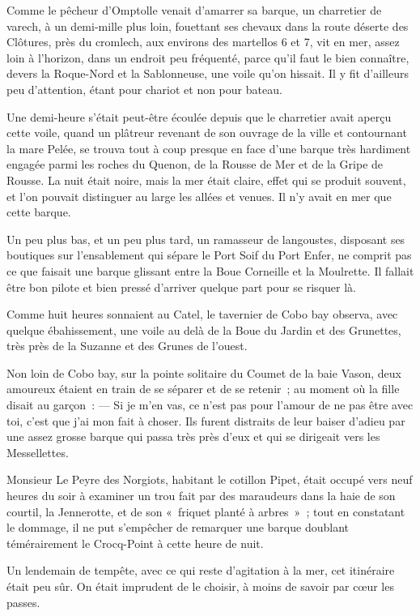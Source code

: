 \documentclass[french,twoside]{book} %
\begin{document}
Comme le pêcheur d’Omptolle venait d’amarrer sa barque, un charretier de varech, à un demi-mille plus loin, fouettant ses chevaux dans la route déserte des Clôtures, près du cromlech, aux environs des martellos 6 et 7, vit en mer, assez loin à l’horizon, dans un endroit peu fréquenté, parce qu’il faut le bien  connaître, devers la Roque-Nord et la Sablonneuse, une voile qu’on hissait. Il y fit d’ailleurs peu d’attention, étant pour chariot et non pour bateau.\par
Une demi-heure s’était peut-être écoulée depuis que le charretier avait aperçu cette voile, quand un plâtreur revenant de son ouvrage de la ville et contournant la mare Pelée, se trouva tout à coup presque en face d’une barque très hardiment engagée parmi les roches du Quenon, de la Rousse de Mer et de la Gripe de Rousse. La nuit était noire, mais la mer était claire, effet qui se produit souvent, et l’on pouvait distinguer au large les allées et venues. Il n’y avait en mer que cette barque.\par
Un peu plus bas, et un peu plus tard, un ramasseur de langoustes, disposant ses boutiques sur l’ensablement qui sépare le Port Soif du Port Enfer, ne comprit pas ce que faisait une barque glissant entre la Boue Corneille et la Moulrette. Il fallait être bon pilote et bien pressé d’arriver quelque part pour se risquer là.\par
Comme huit heures sonnaient au Catel, le tavernier de Cobo bay observa, avec quelque ébahissement, une voile au delà de la Boue du Jardin et des Grunettes, très près de la Suzanne et des Grunes de l’ouest.\par
Non loin de Cobo bay, sur la pointe solitaire du Coumet de la baie Vason, deux amoureux étaient en train de se séparer et de se retenir ; au moment où la fille disait au garçon : — Si je m’en vas, ce n’est pas pour l’amour de ne pas être avec toi, c’est que j’ai  mon fait à choser. Ils furent distraits de leur baiser d’adieu par une assez grosse barque qui passa très près d’eux et qui se dirigeait vers les Messellettes.\par
Monsieur Le Peyre des Norgiots, habitant le cotillon Pipet, était occupé vers neuf heures du soir à examiner un trou fait par des maraudeurs dans la haie de son courtil, la Jennerotte, et de son « friquet planté à arbres » ; tout en constatant le dommage, il ne put s’empêcher de remarquer une barque doublant témérairement le Crocq-Point à cette heure de nuit.\par
Un lendemain de tempête, avec ce qui reste d’agitation à la mer, cet itinéraire était peu sûr. On était imprudent de le choisir, à moins de savoir par cœur les passes.\par
\end{document}

